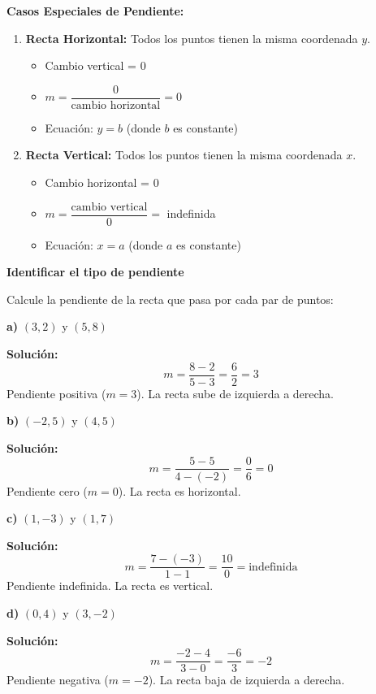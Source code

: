 \begin{theorem}
\textbf{Casos Especiales de Pendiente:}

\begin{enumerate}
    \item \textbf{Recta Horizontal:} Todos los puntos tienen la misma coordenada $y$.
    \begin{itemize}
        \item Cambio vertical = 0
        \item $m = \dfrac{0}{\text{cambio horizontal}} = 0$
        \item Ecuación: $y = b$ (donde $b$ es constante)
    \end{itemize}

    \item \textbf{Recta Vertical:} Todos los puntos tienen la misma coordenada $x$.
    \begin{itemize}
        \item Cambio horizontal = 0
        \item $m = \dfrac{\text{cambio vertical}}{0} = $ indefinida
        \item Ecuación: $x = a$ (donde $a$ es constante)
    \end{itemize}
\end{enumerate}
\end{theorem}

\newpage

\begin{example}
\textbf{Identificar el tipo de pendiente}

Calcule la pendiente de la recta que pasa por cada par de puntos:

\textbf{a)} $(3, 2)$ y $(5, 8)$

\textbf{Solución:}
$$m = \frac{8 - 2}{5 - 3} = \frac{6}{2} = 3$$
Pendiente positiva ($m = 3$). La recta sube de izquierda a derecha.

\textbf{b)} $(-2, 5)$ y $(4, 5)$

\textbf{Solución:}
$$m = \frac{5 - 5}{4 - (-2)} = \frac{0}{6} = 0$$
Pendiente cero ($m = 0$). La recta es horizontal.

\textbf{c)} $(1, -3)$ y $(1, 7)$

\textbf{Solución:}
$$m = \frac{7 - (-3)}{1 - 1} = \frac{10}{0} = \text{indefinida}$$
Pendiente indefinida. La recta es vertical.

\textbf{d)} $(0, 4)$ y $(3, -2)$

\textbf{Solución:}
$$m = \frac{-2 - 4}{3 - 0} = \frac{-6}{3} = -2$$
Pendiente negativa ($m = -2$). La recta baja de izquierda a derecha.
\end{example}

